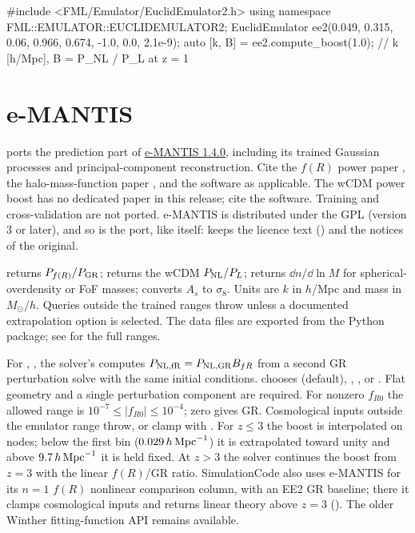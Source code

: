 \begin{cppcode}
#include <FML/Emulator/EuclidEmulator2.h>
using namespace FML::EMULATOR::EUCLIDEMULATOR2;
EuclidEmulator ee2(0.049, 0.315, 0.06, 0.966, 0.674, -1.0, 0.0, 2.1e-9);
auto [k, B] = ee2.compute_boost(1.0);      // k [h/Mpc], B = P_NL / P_L at z = 1
\end{cppcode}

\section{e-MANTIS}\label{sec:fit-emantis}

 ports the prediction part of
\href{https://gitlab.obspm.fr/e-mantis/e-mantis}{e-MANTIS 1.4.0}, including its trained Gaussian processes and
principal-component reconstruction. Cite the $f(R)$ power paper \cite{SaezCasares2023}, the halo-mass-function paper
\cite{SaezCasares2024}, and the software \cite{EMantisSoftware} as applicable. The wCDM power boost has no dedicated
paper in this release; cite the software. Training and cross-validation are not ported. e-MANTIS is distributed under
the GPL (version 3 or later), and so is the port, like \fml{} itself:  keeps the licence text
() and the notices of the original.

 returns $P_{f(R)}/P_{\rm GR}$;  returns the wCDM
$P_{\rm NL}/P_L$;  returns $\dd n/\dd\ln M$ for spherical-overdensity or FoF masses;
 converts $A_s$ to $\sigma_8$. Units are $k$ in $h$/Mpc and mass in $M_\odot/h$.
Queries outside the trained ranges throw unless a documented extrapolation option is selected.
The data files are exported from the Python package; see  for the full ranges.

For , , the solver's  computes
$P_{\rm NL,fR}=P_{\rm NL,GR} B_{fR}$ from a second GR perturbation solve with the same initial conditions.
 chooses  (default), , ,  or
. Flat geometry and a single perturbation component are required.
For nonzero $f_{R0}$ the allowed range is $10^{-7}\le |f_{R0}|\le10^{-4}$; zero gives GR.
Cosmological inputs outside the emulator range throw, or clamp with .
For $z\le3$ the boost is interpolated on  nodes; below the first bin
($0.029\,h\,\mathrm{Mpc}^{-1}$) it is extrapolated toward unity and above $9.7\,h\,\mathrm{Mpc}^{-1}$ it is held fixed.
At $z>3$ the solver continues the boost from $z=3$ with the linear $f(R)$/GR ratio.
SimulationCode also uses e-MANTIS for its $n=1$ $f(R)$ nonlinear comparison column, with an EE2 GR baseline;
there it clamps cosmological inputs and returns linear theory above $z=3$ ().
The older Winther fitting-function API remains available.

